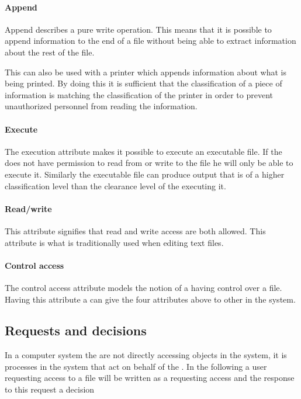 \paragraph{Append}
Append describes a pure write operation.
This means that it is possible to append information to the end of a file without being able to extract information about the rest of the file.

This can also be used with a printer which appends information about what is being printed.
By doing this it is sufficient that the classification of a piece of information is matching the classification of the printer in order to prevent unauthorized personnel from reading the information.

\paragraph{Execute}
The execution attribute makes it possible to execute an executable file.
If the \principal{} does not have permission to read from or write to the file he will only be able to execute it.
Similarly the executable file can produce output that is of a higher classification level than the clearance level of the \principal{} executing it.

\paragraph{Read/write}
This attribute signifies that read and write access are both allowed.
This attribute is what is traditionally used when editing text files.

\paragraph{Control access}
The control access attribute models the notion of a \principal{} having control over a file.
Having this attribute a \principal{} can give the four attributes above to other \principals{} in the system.

\subsection{Requests and decisions}
In a computer system the \principals{} are not directly accessing objects in the system, it is processes in the system that act on behalf of the \principal{}.
In the following a user requesting access to a file will be written as a \principal{} requesting access and the response to this request a decision

